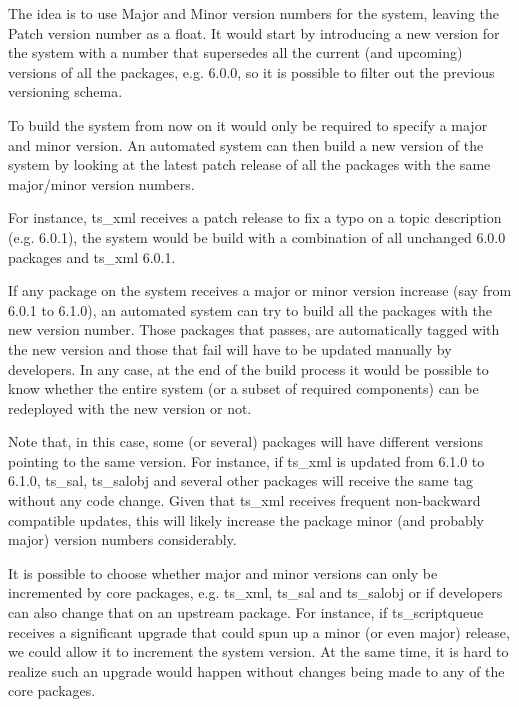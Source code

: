 \documentclass[TS,authoryear,toc]{lsstdoc}
\begin{document}
The idea is to use Major and Minor version numbers for the system, leaving the Patch version 
number as a float. It would start by introducing a new version for the system with a number that 
supersedes all the current (and upcoming) versions of all the packages, e.g. 6.0.0, so it is possible 
to filter out the previous versioning schema. 

To build the system from now on it would only be required to specify a major and minor version. An 
automated system can then build a new version of the system by looking at the latest patch release 
of all the packages with the same major/minor version numbers. 

For instance, ts\_xml receives a patch release to fix a typo on a topic description (e.g. 6.0.1), the 
system would be build with a combination of all unchanged 6.0.0 packages and ts\_xml 6.0.1.  

If any package on the system receives a major or minor version increase (say from 6.0.1 to 6.1.0), an 
automated system can try to build all the packages with the new version number. Those packages 
that passes, are automatically tagged with the new version and those that fail will have to be 
updated manually by developers. In any case, at the end of the build process it would be possible 
to know whether the entire system (or a subset of required components) can be redeployed with 
the new version or not. 

Note that, in this case, some (or several) packages will have different versions pointing to the
same version. For instance, if ts\_xml is updated from 6.1.0 to 6.1.0, ts\_sal, ts\_salobj and several 
other packages will receive the same tag without any code change. Given that ts\_xml 
receives frequent non-backward compatible updates, this will likely increase the package
minor (and probably major) version numbers considerably. 

It is possible to choose whether major and minor versions can only be incremented by core 
packages, e.g. ts\_xml, ts\_sal and ts\_salobj or if developers can also change that on 
an upstream package. For instance, if ts\_scriptqueue receives a significant upgrade that could
spun up a minor (or even major) release, we could allow it to increment the system version. 
At the same time, it is hard to realize such an upgrade would happen without changes being 
made to any of the core packages. 

% 

% 
\end{document}
